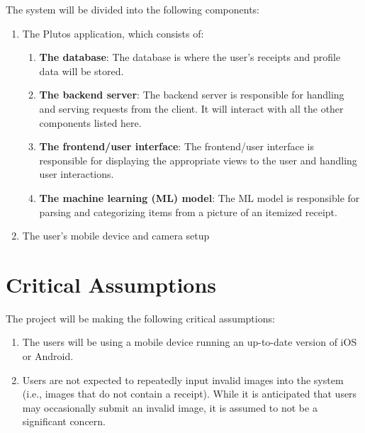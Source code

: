 \documentclass{article}
\begin{document}
The system will be divided into the following components:
\begin{enumerate}
    \item The Plutos application, which consists of:
    \begin{enumerate}
        \item \textbf{The database}: The database is where the user’s receipts
        and profile data will be stored.
        \item \textbf{The backend server}: The backend server is responsible for
        handling and serving requests from the client. It will interact with all
        the other components listed here.
        \item \textbf{The frontend/user interface}: The frontend/user interface
        is responsible for displaying the appropriate views to the user and
        handling user interactions.
        \item \textbf{The machine learning (ML) model}: The ML model is
        responsible for parsing and categorizing items from a picture of an
        itemized receipt.
    \end{enumerate}
    \item The user’s mobile device and camera setup
\end{enumerate}


\section{Critical Assumptions}

The project will be making the following critical assumptions: 
\begin{enumerate}
    \item The users will be
    using a mobile device running an up-to-date version of iOS or Android.
    \item Users are
    not expected to repeatedly input invalid images into the system (i.e., images
    that do not contain a receipt). While it is anticipated that users may
    occasionally submit an invalid image, it is assumed to not be a significant
    concern.
\end{enumerate}  
\end{document}
